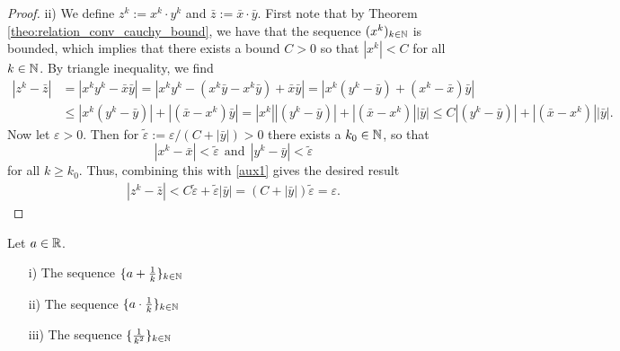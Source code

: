 \begin{frame}
\begin{proof}
		ii) We define $z^k := x^k \cdot y^k$ and $\bar{z} := \bar{x} \cdot \bar{y}$. First note that by Theorem \ref{theo:relation_conv_cauchy_bound}, we have that the sequence $(x^k)_{k\in {\mathbb{N}}}$ is bounded, which implies that there exists a bound $C>0$ so that $|x^k| < C$ for all $k\in{\mathbb{N}}$. By triangle inequality, we find
	\begin{equation} \label{aux1}
	\begin{aligned}
	|z^k - \bar{z}| &= |x^ky^k -  \bar{x}\bar{y}| 
	= |x^ky^k - (x^k\bar{y}-x^k\bar{y}) + \bar{x}\bar{y}| 
	= |x^k(y^k-\bar{y}) +  (x^k-\bar{x})\bar{y}| \\ 
	&\leq  |x^k(y^k-\bar{y})| +  |( \bar{x}-x^k)\bar{y}| 
	=  |x^k ||(y^k-\bar{y})| +  |( \bar{x}-x^k)||\bar{y}| 
	\leq C |(y^k-\bar{y})| + |( \bar{x}-x^k)||\bar{y}|.
	\end{aligned}
	\end{equation}
	Now let $\varepsilon> 0$. Then for $\tilde{\varepsilon} := \varepsilon/ (C+|\bar{y}|) > 0$ there exists a $k_0 \in {\mathbb{N}}$, so that 
	$$|x^k-\bar{x}| <  \tilde{\varepsilon} ~~\text{and}~~|y^k-\bar{y}| <  \tilde{\varepsilon}$$
	for all $k \geq k_0$. Thus, combining this with \eqref{aux1} 
	gives the desired result
	\begin{align*}
	|z^k - \bar{z}|  < C \tilde{\varepsilon}  + \tilde{\varepsilon} |\bar{y}| = (C+|\bar{y}|)\tilde{\varepsilon}  = \varepsilon.
	\end{align*}
\end{proof}
 \end{frame}

\begin{frame}
	\begin{ex}
		\blank Let $a \in {\mathbb{R}}$.
		\begin{itemize}
			\item[i)] The sequence $\{a + \frac{1}{k}\}_{k\in{\mathbb{N}}}$
			\item[ii)] The sequence $\{a \cdot\frac{1}{k}\}_{k\in{\mathbb{N}}}$
			\item[iii)] The sequence $\{ \frac{1}{k^2}\}_{k\in{\mathbb{N}}}$
		\end{itemize}
	\end{ex}
\end{frame}

